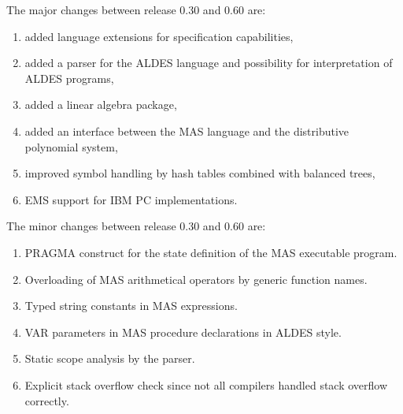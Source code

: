 The major changes between release 0.30 and 0.60 are:
\begin{enumerate}
\item added language extensions for specification capabilities,
\item added a parser for the ALDES language and 
      possibility for interpretation of ALDES programs,
\item added a linear algebra package,
\item added an interface between the MAS language 
      and the distributive polynomial system,
\item improved symbol handling by hash tables 
      combined with balanced trees,
\item EMS support for IBM PC implementations.
\end{enumerate}

The minor changes between release 0.30 and 0.60 are:
\begin{enumerate}
\item PRAGMA construct for the state definition of 
      the MAS executable program.
\item Overloading of MAS arithmetical operators 
      by generic function names.
\item Typed string constants in MAS expressions.
\item VAR parameters in MAS procedure declarations in 
      ALDES style.
\item Static scope analysis by the parser.
\item Explicit stack overflow check since not all compilers 
      handled stack overflow correctly.
\end{enumerate}


\def\etal{{\em et. al. }}

